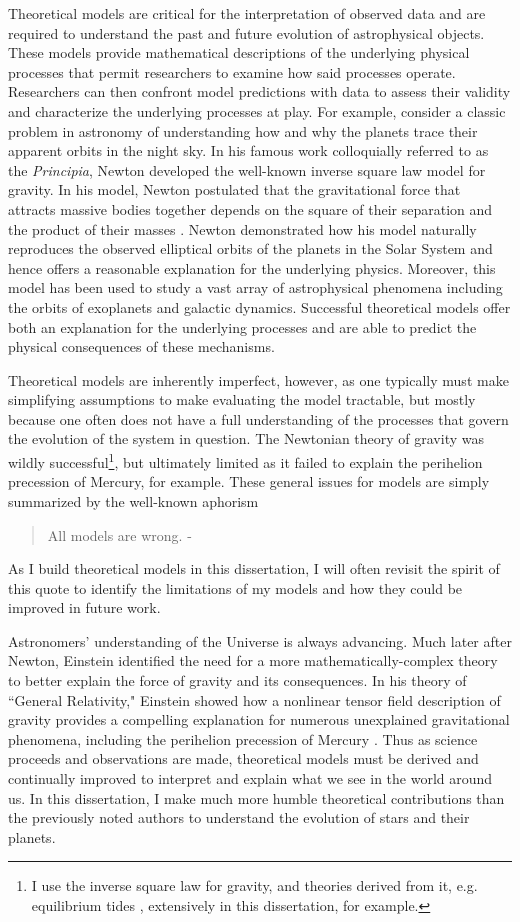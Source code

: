 Theoretical models are critical for the interpretation of observed data and are required to understand the past and future evolution of astrophysical objects. These models provide mathematical descriptions of the underlying physical processes that permit researchers to examine how said processes operate. Researchers can then confront model predictions with data to assess their validity and characterize the underlying processes at play. For example, consider a classic problem in astronomy of understanding how and why the planets trace their apparent orbits in the night sky. In his famous work colloquially referred to as the \textit{Principia}, Newton developed the well-known inverse square law model for gravity. In his model, Newton postulated that the gravitational force that attracts massive bodies together depends on the square of their separation and the product of their masses \citep{Newton1687,Newton1999}. Newton demonstrated how his model naturally reproduces the observed elliptical orbits of the planets in the Solar System and hence offers a reasonable explanation for the underlying physics. Moreover, this model has been used to study a vast array of astrophysical phenomena including the orbits of exoplanets and galactic dynamics. Successful theoretical models offer both an explanation for the underlying processes and are able to predict the physical consequences of these mechanisms.

Theoretical models are inherently imperfect, however, as one typically must make simplifying assumptions to make evaluating the model tractable, but mostly because one often does not have a full understanding of the processes that govern the evolution of the system in question. The Newtonian theory of gravity was wildly successful\footnote{I use the inverse square law for gravity, and theories derived from it, e.g. equilibrium tides \citep{Darwin1880}, extensively in this dissertation, for example.}, but ultimately limited as it failed to explain the perihelion precession of Mercury, for example. These general issues for models are simply summarized by the well-known aphorism
\begin{quote}
All models are wrong. - \citet{Box1976}
\end{quote}
As I build theoretical models in this dissertation, I will often revisit the spirit of this quote to identify the limitations of my models and how they could be improved in future work.

Astronomers' understanding of the Universe is always advancing. Much later after Newton, Einstein identified the need for a more mathematically-complex theory to better explain the force of gravity and its consequences. In his theory of ``General Relativity," Einstein showed how a nonlinear tensor field description of gravity provides a compelling explanation for numerous unexplained gravitational phenomena, including the perihelion precession of Mercury \citep{Einstein1915b,Einstein1915a}. Thus as science proceeds and observations are made, theoretical models must be derived and continually improved to interpret and explain what we see in the world around us. In this dissertation, I make much more humble theoretical contributions than the previously noted authors to understand the evolution of stars and their planets. 


